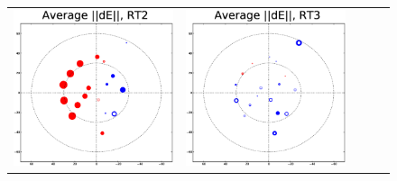 \documentclass[]{article}
\begin{document}
\begin{figure}
\begin{tabular}{@{}c@{}c@{}c@{}c@{}c@{}}
\includegraphics[width=\roguewidth]{qmc2b_dE_ant2} &
\includegraphics[width=\roguewidth]{qmc2b_dE_ant3} &

\end{tabular}
\end{figure}
\end{document}
